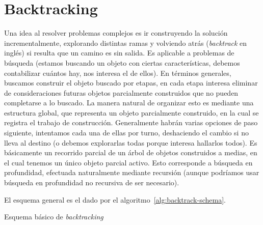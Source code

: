 


\chapter{Backtracking}
\label{cha:backtracking}

  Una idea al resolver problemas complejos
  es ir construyendo la solución incrementalmente,
  explorando distintas ramas
  y volviendo atrás
  (\emph{\foreignlanguage{english}{backtrack}} en inglés)
  si resulta que un camino es sin salida.
  Es aplicable a problemas de búsqueda
  (estamos buscando un objeto con ciertas características,
   debemos contabilizar cuántos hay,
   nos interesa el  de ellos).
  En términos generales,
  buscamos construir el objeto buscado por etapas,
  en cada etapa interesa eliminar de consideraciones futuras
  objetos parcialmente construidos que no pueden completarse a lo buscado.
  La manera natural de organizar esto es mediante una estructura global,
  que representa un objeto parcialmente construido,
  en la cual se registra el trabajo de construcción.
  Generalmente habrán varias opciones de paso siguiente,
  intentamos cada una de ellas por turno,
  deshaciendo el cambio si no lleva al destino
  (o debemos explorarlas todas porque interesa hallarlos todos).
  Es básicamente un recorrido parcial
  de un árbol de objetos construidos a medias,
  en el cual tenemos un único objeto parcial activo.
  Esto corresponde a búsqueda en profundidad,
  efectuada naturalmente mediante recursión
  (aunque podríamos usar búsqueda en profundidad no recursiva
   de ser necesario).

  El esquema general es el dado por el algoritmo~\ref{alg:backtrack-schema}.
  \begin{algorithm}
    \DontPrintSemicolon

     \;

    \caption{Esquema básico de \emph{\foreignlanguage{english}{backtracking}}}
    \label{alg:backtrack-schema}
  \end{algorithm}

